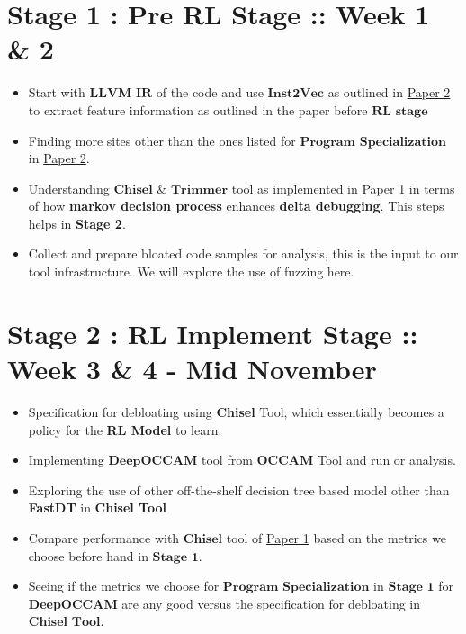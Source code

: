\documentclass{article} %
\begin{document}
\section*{Stage 1 : Pre RL Stage :: Week 1 \& 2}
\begin{itemize}
    \item Start with $\textbf{LLVM IR}$ of the code and use $\textbf{Inst2Vec}$ as outlined in \href{http://www.csl.sri.com/users/gehani/papers/MLSys-2019.DeepOCCAM.pdf}{Paper 2} to extract feature information as outlined in the paper before $\textbf{RL stage}$
    \item Finding more sites other than the ones listed for $\textbf{Program Specialization}$ in \href{http://www.csl.sri.com/users/gehani/papers/MLSys-2019.DeepOCCAM.pdf}{Paper 2}.  
    \item Understanding $\textbf{Chisel}$ \& $\textbf{Trimmer}$ tool as implemented in \href{https://dl.acm.org/doi/10.1145/3243734.3243838}{Paper 1} in terms of how \textbf{markov decision process} enhances \textbf{delta debugging}. This steps helps in \textbf{Stage 2}.
    \item Collect and prepare bloated code samples for analysis, this is the input to our tool infrastructure. We will explore the use of fuzzing here.  
\end{itemize}

\section*{Stage 2 : RL Implement Stage :: Week 3 \& 4 - Mid November} 
\begin{itemize}
	\item Specification for debloating using \textbf{Chisel} Tool, which essentially becomes a policy for the \textbf{RL Model} to learn. 
    \item Implementing $\textbf{DeepOCCAM}$ tool from $\textbf{OCCAM}$ Tool and run or analysis. 
    \item Exploring the use of other off-the-shelf decision tree based model other than \textbf{FastDT} in \textbf{Chisel Tool} 
    \item Compare performance with $\textbf{Chisel}$ tool of \href{https://dl.acm.org/doi/10.1145/3243734.3243838}{Paper 1} based on the metrics we choose before hand in $\textbf{Stage 1}$. 
    \item Seeing if the metrics we choose for $\textbf{Program Specialization}$ in $\textbf{Stage 1}$ for \textbf{DeepOCCAM} are any good versus the specification for debloating in $\textbf{Chisel Tool}$.  
\end{itemize}
\end{document}

